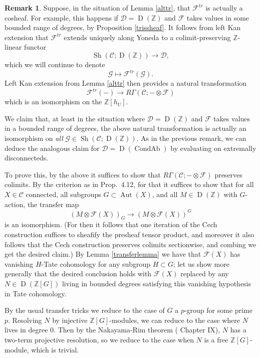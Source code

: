 \documentclass[12pt]{article}
\theoremstyle{definition}
\newtheorem{remark}[theorem]{Remark}
\newcommand{\on}{\operatorname}
\newcommand{\mc}{\mathcal}
\newcommand{\mbb}{\mathbb}
\begin{document}
\begin{remark}\label{poitoulemma}
Suppose, in the situation of Lemma \ref{alttr}, that $\mc{F}^{tr}$ is actually a cosheaf.  For example, this happens if $\mc{D}=\on{D}(\mbb{Z})$ and $\mc{F}$ takes values in some bounded range of degrees, by Proposition \ref{trissheaf}.  It follows from left Kan extension that $\mc{F}^{tr}$ extends uniquely along Yoneda to a colimit-preserving $\mbb{Z}$-linear functor
$$\on{Sh}(\mc{C};\on{D}(\mbb{Z}))\to \mc{D},$$
which we will continue to denote
$$\mc{G} \mapsto \mc{F}^{tr}(\mc{G}).$$
Left Kan extension from Lemma \ref{alttr} then provides a natural transformation
$$\mc{F}^{tr}(-) \to R\Gamma(\mc{C};-\otimes\mc{F})$$
which is an isomorphism on the $\mbb{Z}[h_U]$.

We claim that, at least in the situation where $\mc{D}=\on{D}(\mbb{Z})$ and $\mc{F}$ takes values in a bounded range of degrees, the above natural transformation is actually an isomorphism on \emph{all} $\mc{G}\in\on{Sh}(\mc{C};\on{D}(\mbb{Z}))$.  As in the previous remark, we can deduce the analogous claim for $\mc{D}=\on{D}(\on{CondAb})$ by evaluating on extremally disconnecteds.

To prove this, by the above it suffices to show that $R\Gamma(\mc{C};-\otimes\mc{F})$ preserves colimits.  By the criterion as in \cite{cm1} Prop.\ 4.12, for that it suffices to show that for all $X\in\mc{C}$ connected, all subgroups $G\subset \on{Aut}(X)$, and all $M\in \on{D}(\mbb{Z})$ with $G$-action, the transfer map
$$(M\otimes \mc{F}(X))_G\to (M\otimes \mc{F}(X))^G$$
is an isomorphism.  (For then it follows that one iteration of the Cech construction suffices to sheafify the presheaf tensor product, and moreover it also follows that the Cech construction preserves colimits sectionwise, and combing we get the desired claim.)  By Lemma \ref{transferlemma} we have that $\mc{F}(X)$ has vanishing $H$-Tate cohomology for any subgroup $H\subset G$; let us show more generally that the desired conclusion holds with $\mc{F}(X)$ replaced by any $N\in\on{D}(\mbb{Z}[G])$ living in bounded degrees satisfying this vanishing hypothesis in Tate cohomology.

By the usual transfer tricks we reduce to the case of $G$ a $p$-group for some prime $p$.   Resolving $N$ by injective $\mbb{Z}[G]$-modules, we can reduce to the case where $N$ lives in degree $0$.  Then by the Nakayama-Rim theorem (\cite{corpslocaux} Chapter IX), $N$ has a two-term projective resolution, so we reduce to the case when $N$ is a free $\mbb{Z}[G]$-module, which is trivial.
\end{remark}
\end{document}
